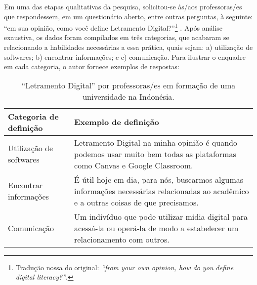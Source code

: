 \documentclass[portuguese]{textolivre}
\begin{document}
Em uma das etapas qualitativas da pesquisa, solicitou-se às/aos professoras/es que respondessem, em um questionário aberto, entre outras perguntas, à seguinte: “em sua opinião, como você define Letramento Digital?”\footnote{Tradução nossa do original: \textit{“from your own opinion, how do you define digital literacy?”}.} \cite[p.~190]{nabhan_pre-service_2021}. Após análise exaustiva, os dados foram compilados em três categorias, que acabaram se relacionando a habilidades necessárias a essa prática, quais sejam: a) utilização de softwares; b) encontrar informações; e c) comunicação. Para ilustrar o enquadre em cada categoria, o autor fornece exemplos de respostas:

\begin{table}[h!]
\centering
\begin{threeparttable}
\caption{“Letramento Digital” por professoras/es em formação de uma universidade na Indonésia.}
\label{Tabela02}
\begin{tabular}{lp{}}
\toprule
Categoria de definição & Exemplo de definição \\
\midrule
Utilização de softwares\protect\footnotemark & Letramento Digital na minha opinião é quando podemos usar muito bem todas as plataformas como Canvas e Google Classroom. \\
Encontrar informações\protect\footnotemark & É útil hoje em dia, para nós, buscarmos algumas informações necessárias relacionadas ao acadêmico e a outras coisas de que precisamos. \\
Comunicação\protect\footnotemark & Um indivíduo que pode utilizar mídia digital para acessá-la ou operá-la de modo a estabelecer um relacionamento com outros. \\
\bottomrule
\end{tabular}
\end{threeparttable}
\end{table}
\addtocounter{footnote}{-3} 
\end{document}
